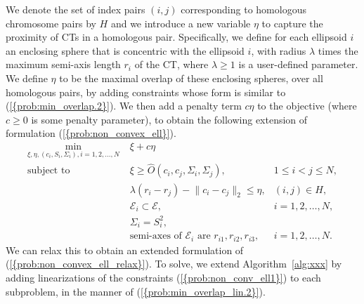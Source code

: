 \documentclass{siamltex}
\providecommand{\norm}[1]{\lVert#1\rVert}
\begin{document}
We denote the set of index pairs $(i,j)$ corresponding to homologous
chromosome pairs by $H$ and we introduce a new variable $\eta$ to
capture the proximity of CTs in a homologous pair.  Specifically, we
define for each ellipsoid $i$ an enclosing sphere that is concentric
with the ellipsoid $i$, with radius $\lambda$ times the maximum
semi-axis length $r_i$ of the CT, where $\lambda \ge 1$ is a
user-defined parameter. We define $\eta$ to be the maximal overlap of
these enclosing spheres, over all homologous pairs, by adding
constraints whose form is similar to {(\ref{{prob:min_overlap.2}})}. We
then add a penalty term $c \eta$ to the objective (where $c\geq 0$ is some
penalty parameter), to obtain the following extension of formulation
{(\ref{{prob:non_convex_ell}})}.
\begin{subequations}
\label{prob:non_convex_ell_heterologous}
\begin{align}
\min_{\xi, \eta, (c_i,S_i,\Sigma_i), i=1,2,\dotsc,N} \;&
\xi + c \eta&\\
\mbox{subject to} \quad&\xi \geq \hat{O}(c_i, c_j, \Sigma_i, \Sigma_j),& 1\leq i<j\leq N, \label{prob:non_conv_ell1}\\ 
\label{prob:non_conv_ell5} & \lambda (r_i - r_j) - \norm{c_i-c_j}_2 \leq \eta, & (i,j)\in H, \\ 
\label{prob:non_conv_ell2} &\mathcal{E}_i\subset \mathcal{E}, & i=1,2,\dots,N, \\ 
\label{prob:non_conv_ell4} &\Sigma_i=S_i^2, \\
\label{prob:non_conv_ell3} &\mbox{semi-axes of }\mathcal{E}_i \mbox{ are } r_{i1}, r_{i2}, r_{i3},  & i=1,2,\dots,N.
\end{align}
\end{subequations}
We can relax this to obtain an extended formulation of
{(\ref{{prob:non_convex_ell_relax}})}. To solve, we extend
Algorithm~\ref{alg:xxx} by adding linearizations of the constraints
{(\ref{{prob:non_conv_ell1}})} to each subproblem, in the manner of
{(\ref{{prob:min_overlap_lin.2}})}.
\end{document}

